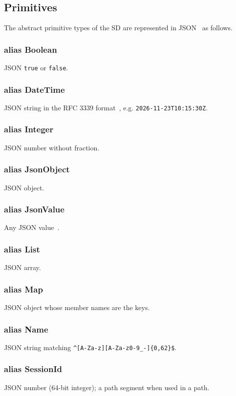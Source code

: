 \documentclass[a4paper]{arrowhead}
\newcommand{\pdef}[1]{{\textcolor{ArrowheadGrey}{#1\label{sec:model:primitives:#1}\label{sec:model:primitives:#1s}}}}
\begin{document}
\subsection{Primitives}
\label{sec:model:primitives}
The abstract primitive types of the SD are represented in JSON~\cite{rfc8259} as follows.
\subsubsection*{alias \pdef{Boolean}}
JSON \texttt{true} or \texttt{false}.

\subsubsection*{alias \pdef{DateTime}}
JSON string in the RFC 3339 format~\cite{rfc3339}, e.g. \texttt{2026-11-23T10:15:30Z}.

\subsubsection*{alias \pdef{Integer}}
JSON number without fraction.

\subsubsection*{alias \pdef{JsonObject}}
JSON object.

\subsubsection*{alias \pdef{JsonValue}}
Any JSON value~\cite{rfc8259}.

\subsubsection*{alias \pdef{List}}
JSON array.

\subsubsection*{alias \pdef{Map}}
JSON object whose member names are the keys.

\subsubsection*{alias \pdef{Name}}
JSON string matching \texttt{\^{}[A-Za-z][A-Za-z0-9\_-]\{0,62\}\$}.

\subsubsection*{alias \pdef{SessionId}}
JSON number (64-bit integer); a path segment when used in a path.
\end{document}
